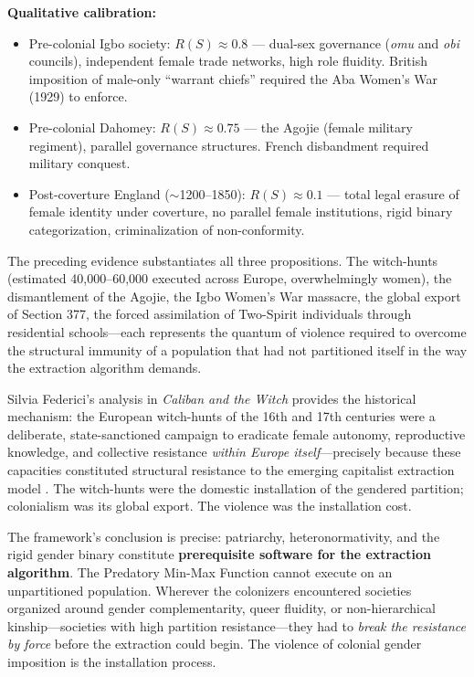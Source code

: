 \begin{definition}
\medskip
\textbf{Qualitative calibration:}
\begin{itemize}[leftmargin=*]
    \item Pre-colonial Igbo society: $R(S) \approx 0.8$ --- dual-sex governance (\textit{omu} and \textit{obi} councils), independent female trade networks, high role fluidity. British imposition of male-only ``warrant chiefs'' required the Aba Women's War (1929) to enforce.
    \item Pre-colonial Dahomey: $R(S) \approx 0.75$ --- the Agojie (female military regiment), parallel governance structures. French disbandment required military conquest.
    \item Post-coverture England ($\sim$1200--1850): $R(S) \approx 0.1$ --- total legal erasure of female identity under coverture, no parallel female institutions, rigid binary categorization, criminalization of non-conformity.
\end{itemize}
\end{definition}

The preceding evidence substantiates all three propositions. The witch-hunts (estimated 40,000--60,000 executed across Europe, overwhelmingly women), the dismantlement of the Agojie, the Igbo Women's War massacre, the global export of Section 377, the forced assimilation of Two-Spirit individuals through residential schools---each represents the quantum of violence required to overcome the structural immunity of a population that had not partitioned itself in the way the extraction algorithm demands.

Silvia Federici's analysis in \textit{Caliban and the Witch} provides the historical mechanism: the European witch-hunts of the 16th and 17th centuries were a deliberate, state-sanctioned campaign to eradicate female autonomy, reproductive knowledge, and collective resistance \textit{within Europe itself}---precisely because these capacities constituted structural resistance to the emerging capitalist extraction model \cite{federici}. The witch-hunts were the domestic installation of the gendered partition; colonialism was its global export. The violence was the installation cost.

The framework's conclusion is precise: patriarchy, heteronormativity, and the rigid gender binary constitute \textbf{prerequisite software for the extraction algorithm}. The Predatory Min-Max Function cannot execute on an unpartitioned population. Wherever the colonizers encountered societies organized around gender complementarity, queer fluidity, or non-hierarchical kinship---societies with high partition resistance---they had to \textit{break the resistance by force} before the extraction could begin. The violence of colonial gender imposition is the installation process.


